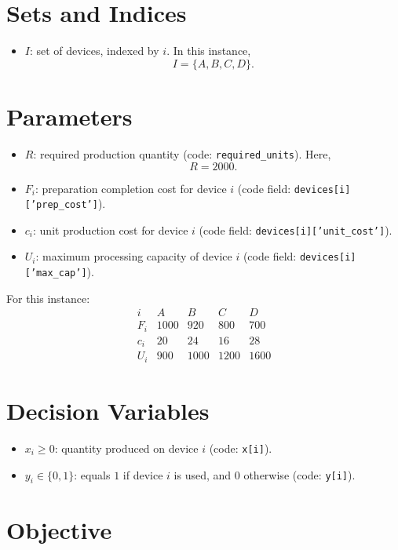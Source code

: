 \section*{Sets and Indices}

\begin{itemize}
    \item $I$: set of devices, indexed by $i$. In this instance,
    \[
    I=\{A,B,C,D\}.
    \]
\end{itemize}

\section*{Parameters}

\begin{itemize}
    \item $R$: required production quantity (code: \texttt{required\_units}). Here,
    \[
    R=2000.
    \]
    \item $F_i$: preparation completion cost for device $i$ (code field: \texttt{devices[i]['prep\_cost']}).
    \item $c_i$: unit production cost for device $i$ (code field: \texttt{devices[i]['unit\_cost']}).
    \item $U_i$: maximum processing capacity of device $i$ (code field: \texttt{devices[i]['max\_cap']}).
\end{itemize}

For this instance:
\[
\begin{array}{c|cccc}
i & A & B & C & D\\
\hline
F_i & 1000 & 920 & 800 & 700\\
c_i & 20 & 24 & 16 & 28\\
U_i & 900 & 1000 & 1200 & 1600
\end{array}
\]

\section*{Decision Variables}

\begin{itemize}
    \item $x_i \ge 0$: quantity produced on device $i$ (code: \texttt{x[i]}).
    \item $y_i \in \{0,1\}$: equals $1$ if device $i$ is used, and $0$ otherwise (code: \texttt{y[i]}).
\end{itemize}

\section*{Objective}

